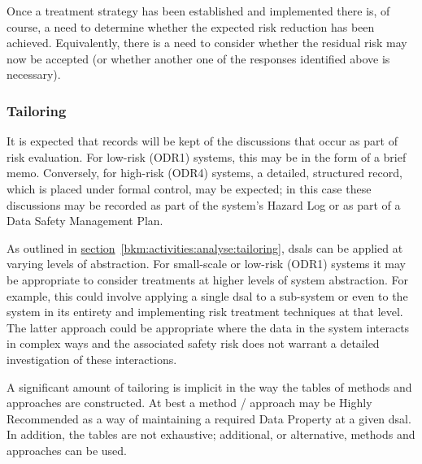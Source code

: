 Once a treatment strategy has been established and implemented there is, of course, a need to determine whether the expected risk reduction has been achieved. Equivalently, there is a need to consider whether the residual risk may now be accepted (or whether another one of the responses identified above is necessary).

\subsubsection{Tailoring}
It is expected that records will be kept of the discussions that occur as part of risk evaluation. For low-risk (ODR1) systems, this may be in the form of a brief memo. Conversely, for high-risk (ODR4) systems, a detailed, structured record, which is placed under formal control, may be expected; in this case these discussions may be recorded as part of the system's Hazard Log or as part of a Data Safety Management Plan.

As outlined in
\hyperref[bkm:activities:analyse:tailoring]{section}~\ref{bkm:activities:analyse:tailoring}, %
\glspl{dsal} can be applied at varying levels of abstraction. For small-scale or low-risk (ODR1) systems it may be appropriate to consider treatments at higher levels of system abstraction. For example, this could involve applying a single \gls{dsal} to a sub-system or even to the system in its entirety and implementing risk treatment techniques at that level. The latter approach could be appropriate where the data in the system interacts in complex ways and the associated safety risk does not warrant a detailed investigation of these interactions.

A significant amount of tailoring is implicit in the way the tables of methods and approaches are constructed. At best a method / approach may be Highly Recommended as a way of maintaining a required Data Property at a given \gls{dsal}. In addition, the tables are not exhaustive; additional, or alternative, methods and approaches can be used.
